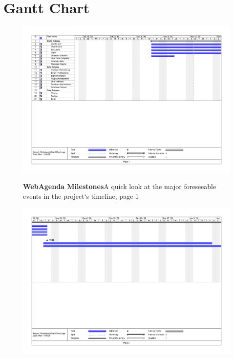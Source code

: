 \documentclass[letterpaper,12pt]{report}
\begin{document}
\section{Gantt Chart}
\begin{landscape}
\begin{figure}[htp]
  \includegraphics[scale=0.7]{externals/gantt1.pdf}
 \caption{\small
\textbf{WebAgenda Milestones}\newline \space A quick look at the major foreseeable events in the project`s timeline, page 1}
\label{fig:gantt1}
\end{figure}
\newpage
\begin{figure}[htp]
  \includegraphics[scale=0.7]{externals/gantt2.pdf}

\end{figure}
\end{landscape}
\end{document}
